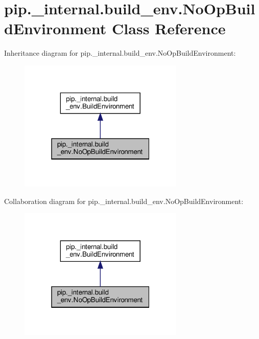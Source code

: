 \hypertarget{classpip_1_1__internal_1_1build__env_1_1NoOpBuildEnvironment}{}\section{pip.\+\_\+internal.\+build\+\_\+env.\+No\+Op\+Build\+Environment Class Reference}
\label{classpip_1_1__internal_1_1build__env_1_1NoOpBuildEnvironment}


Inheritance diagram for pip.\+\_\+internal.\+build\+\_\+env.\+No\+Op\+Build\+Environment\+:
\nopagebreak
\begin{figure}[H]
\begin{center}
\leavevmode
\includegraphics[width=223pt]{classpip_1_1__internal_1_1build__env_1_1NoOpBuildEnvironment__inherit__graph}
\end{center}
\end{figure}


Collaboration diagram for pip.\+\_\+internal.\+build\+\_\+env.\+No\+Op\+Build\+Environment\+:
\nopagebreak
\begin{figure}[H]
\begin{center}
\leavevmode
\includegraphics[width=223pt]{classpip_1_1__internal_1_1build__env_1_1NoOpBuildEnvironment__coll__graph}
\end{center}
\end{figure}
